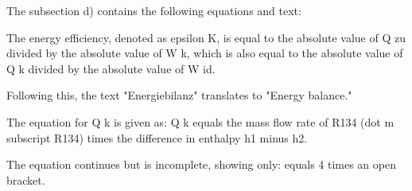 The subsection d) contains the following equations and text:

The energy efficiency, denoted as epsilon K, is equal to the absolute value of Q zu divided by the absolute value of W k, which is also equal to the absolute value of Q k divided by the absolute value of W id.

Following this, the text "Energiebilanz" translates to "Energy balance."

The equation for Q k is given as:
Q k equals the mass flow rate of R134 (dot m subscript R134) times the difference in enthalpy h1 minus h2.

The equation continues but is incomplete, showing only:
equals 4 times an open bracket.